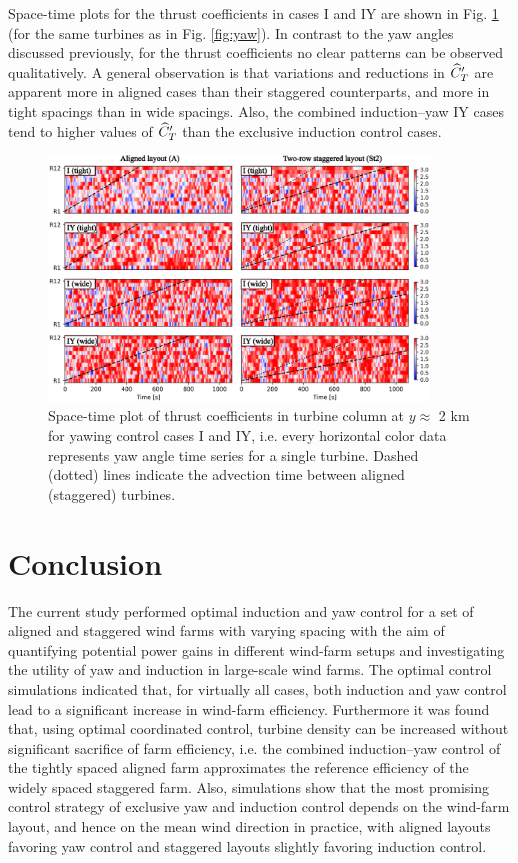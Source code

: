 \documentclass[a4paper]{jpconf}
\begin{document}
Space-time plots for the thrust coefficients in cases I and IY are shown in Fig. \ref{fig:ctfilt} (for the same turbines as in Fig. \ref{fig:yaw}). In contrast to the yaw angles discussed previously, for the thrust coefficients no clear patterns can be observed qualitatively. A general observation is that variations and reductions in $\widehat{C}_T'$ are apparent more in aligned cases than their staggered counterparts, and more in tight spacings than in wide spacings. Also, the combined induction--yaw IY cases tend to higher values of $\widehat{C}_T'$ than the exclusive induction control cases. 

\begin{figure}[b]
	\centering
	\includegraphics[width=0.9\textwidth]{Torque18/ctfilts}
	\caption{Space-time plot of thrust coefficients in turbine column at $y \approx $ 2 km for yawing control cases I and IY, i.e. every horizontal color data represents yaw angle time series for a single turbine. Dashed (dotted) lines indicate the advection time between aligned (staggered) turbines. \label{fig:ctfilt}}
\end{figure}




\section{Conclusion}\label{sec:conc}
The current study performed optimal induction and yaw control for a set of aligned and staggered wind farms with varying spacing with the aim of quantifying potential power gains in different wind-farm setups and investigating the utility of yaw and induction in large-scale wind farms. The optimal control simulations indicated that, for virtually all cases, both induction and yaw control lead to a significant increase in wind-farm efficiency. Furthermore it was found that, using optimal coordinated control, turbine density can be increased without significant sacrifice of farm efficiency, i.e. the combined induction--yaw control of the tightly spaced aligned farm approximates the reference efficiency of the widely spaced staggered farm. Also, simulations show that the most promising control strategy of exclusive yaw and induction control depends on the wind-farm layout, and hence on the mean wind direction in practice, with aligned layouts favoring yaw control and staggered layouts slightly favoring induction control. 
\end{document}
